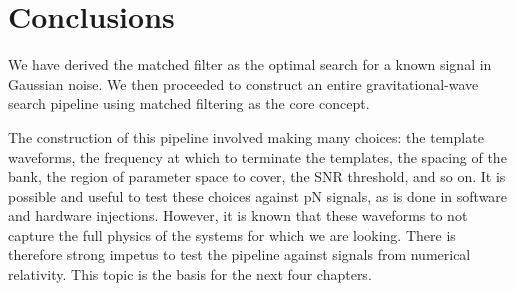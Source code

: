 \section{Conclusions}

We have derived the matched filter as the optimal search for a known
signal in Gaussian noise.  We then proceeded to construct an entire
gravitational-wave search pipeline using matched filtering as the core
concept.

The construction of this pipeline involved making many choices: the
template waveforms, the frequency at which to terminate the templates,
the spacing of the bank, the region of parameter space to cover, the
SNR threshold, and so on.  It is possible and useful to test
these choices against pN signals, as is done in software and hardware
injections.   However, it is known that these waveforms to not capture
the full physics of the systems for which we are looking.  There is
therefore strong impetus to test the pipeline against signals from
numerical relativity.  This topic is the basis for the next four
chapters.



